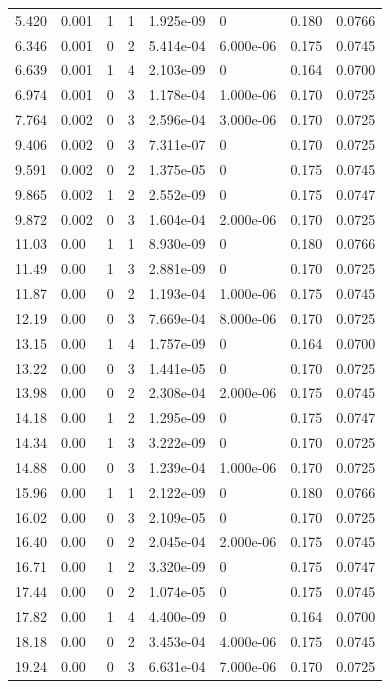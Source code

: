 \documentclass[preview]{standalone}
\begin{document}
{{\begin{tabular}{L{1.2cm}C{1.2cm} C{0.3cm}C{0.5cm} C{1.4cm}C{1.4cm} C{1.4cm}C{1.4cm}}
  5.420  &  0.001  & 1     &  1 &  1.925e-09  & 0  & 0.180 &  0.0766   \\ 
  6.346  &  0.001  & 0     &  2 &  5.414e-04  & 6.000e-06  & 0.175 &  0.0745   \\ 
  6.639  &  0.001  & 1     &  4 &  2.103e-09  & 0  & 0.164 &  0.0700   \\ 
  6.974  &  0.001  & 0     &  3 &  1.178e-04  & 1.000e-06  & 0.170 &  0.0725   \\ 
  7.764  &  0.002  & 0     &  3 &  2.596e-04  & 3.000e-06  & 0.170 &  0.0725   \\ 
  9.406  &  0.002  & 0     &  3 &  7.311e-07  & 0  & 0.170 &  0.0725   \\ 
  9.591  &  0.002  & 0     &  2 &  1.375e-05  & 0  & 0.175 &  0.0745   \\ 
  9.865  &  0.002  & 1     &  2 &  2.552e-09  & 0  & 0.175 &  0.0747   \\ 
  9.872  &  0.002  & 0     &  3 &  1.604e-04  & 2.000e-06  & 0.170 &  0.0725   \\ 
  11.03  &  0.00  & 1     &  1 &  8.930e-09  & 0  & 0.180 &  0.0766   \\ 
  11.49  &  0.00  & 1     &  3 &  2.881e-09  & 0  & 0.170 &  0.0725   \\ 
  11.87  &  0.00  & 0     &  2 &  1.193e-04  & 1.000e-06  & 0.175 &  0.0745   \\ 
  12.19  &  0.00  & 0     &  3 &  7.669e-04  & 8.000e-06  & 0.170 &  0.0725   \\ 
  13.15  &  0.00  & 1     &  4 &  1.757e-09  & 0  & 0.164 &  0.0700   \\ 
  13.22  &  0.00  & 0     &  3 &  1.441e-05  & 0  & 0.170 &  0.0725   \\ 
  13.98  &  0.00  & 0     &  2 &  2.308e-04  & 2.000e-06  & 0.175 &  0.0745   \\ 
  14.18  &  0.00  & 1     &  2 &  1.295e-09  & 0  & 0.175 &  0.0747   \\ 
  14.34  &  0.00  & 1     &  3 &  3.222e-09  & 0  & 0.170 &  0.0725   \\ 
  14.88  &  0.00  & 0     &  3 &  1.239e-04  & 1.000e-06  & 0.170 &  0.0725   \\ 
  15.96  &  0.00  & 1     &  1 &  2.122e-09  & 0  & 0.180 &  0.0766   \\ 
  16.02  &  0.00  & 0     &  3 &  2.109e-05  & 0  & 0.170 &  0.0725   \\ 
  16.40  &  0.00  & 0     &  2 &  2.045e-04  & 2.000e-06  & 0.175 &  0.0745   \\ 
  16.71  &  0.00  & 1     &  2 &  3.320e-09  & 0  & 0.175 &  0.0747   \\ 
  17.44  &  0.00  & 0     &  2 &  1.074e-05  & 0  & 0.175 &  0.0745   \\ 
  17.82  &  0.00  & 1     &  4 &  4.400e-09  & 0  & 0.164 &  0.0700   \\ 
  18.18  &  0.00  & 0     &  2 &  3.453e-04  & 4.000e-06  & 0.175 &  0.0745   \\ 
  19.24  &  0.00  & 0     &  3 &  6.631e-04  & 7.000e-06  & 0.170 &  0.0725   \\ 
\hline 
\end{tabular} 

}}
\end{document}
